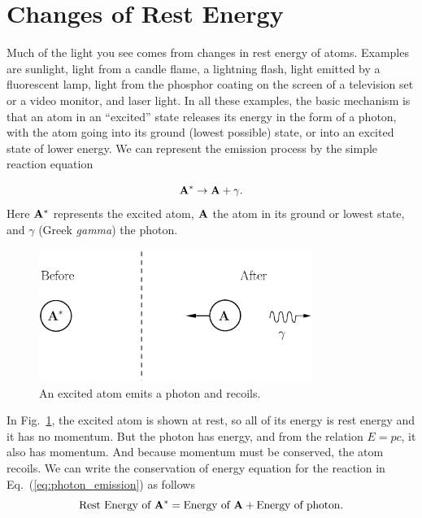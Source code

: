 \section{Changes of Rest Energy}
  Much of the light you see comes from changes in rest energy of
atoms.  Examples are sunlight, light from a candle flame, a lightning
flash, light emitted by a fluorescent lamp, light from the phosphor
coating on the screen of a television set or a video monitor, and
laser light.  In all these examples, the basic mechanism is that an
atom in an ``excited'' state releases its energy in the form of a
photon, with the atom going into its ground (lowest possible) state,
or into an excited state of lower energy.  We can represent the
emission process by the simple reaction equation

\begin{equation}
{\bf A}^\ast \rightarrow {\bf A} + \gamma. 
\label{eq:photon_emission}
\end{equation}
Here ${\bf A}^\ast$ represents the excited atom, ${\bf A}$ the atom in its
ground or lowest state, and $\gamma$ (Greek {\em gamma}) the photon.

\begin{figure}[tbp]
\begin{center}
\includegraphics[width=3.5in]{relativity_conservation/photon_emission1.eps}
\end{center}
\caption{An excited atom emits a photon and recoils.}
\label{fig:photon_emission1}
\end{figure}

In Fig.~\ref{fig:photon_emission1}, the excited atom is shown at rest,
so all of its energy is rest energy and it has no momentum.  But the
photon has energy, and from the relation $E = pc$, it also has
momentum.  And because momentum must be conserved, the atom recoils.
We can write the conservation of energy equation for the reaction in
Eq.~(\ref{eq:photon_emission}) as follows
\begin{equation}
\text{Rest Energy of ${\bf A}^\ast$} = \text{Energy of ${\bf A}$} 
+ \text{Energy of photon}.
\end{equation}
     
